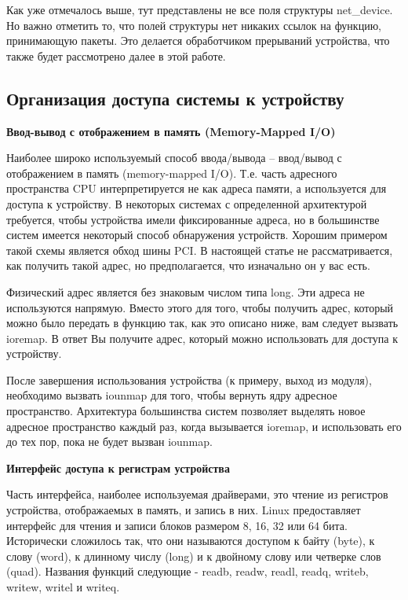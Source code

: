 Как уже отмечалось выше, тут представлены не все поля структуры net\_device. Но важно отметить то, что полей структуры нет никаких ссылок на функцию, принимающую пакеты. Это делается обработчиком прерываний устройства, что также будет рассмотрено далее в этой работе\cite{Rosen}.

\newpage
\subsection{Организация доступа системы к устройству}

\textbf{Ввод-вывод с отображением в память (Memory-Mapped I/O)}

Наиболее широко используемый способ ввода/вывода -- ввод/вывод с отображением в память (memory-mapped I/O)\cite{Cragon}. Т.е. часть адресного пространства CPU интерпретируется не как адреса памяти, а используется для доступа к устройству. В некоторых системах с определенной архитектурой требуется, чтобы устройства имели фиксированные адреса, но в большинстве систем имеется некоторый способ обнаружения устройств. Хорошим примером такой схемы является обход шины PCI. В настоящей статье не рассматривается, как получить такой адрес, но предполагается, что изначально он у вас есть.

Физический адрес является без знаковым числом типа long. Эти адреса не используются напрямую. Вместо этого для того, чтобы получить адрес, который можно было передать в функцию так, как это описано ниже, вам следует вызвать ioremap. В ответ Вы получите адрес, который можно использовать для доступа к устройству.

После завершения использования устройства (к примеру, выход из модуля), необходимо вызвать iounmap для того, чтобы вернуть ядру адресное пространство. Архитектура большинства систем позволяет выделять новое адресное пространство каждый раз, когда вызывается ioremap, и использовать его до тех пор, пока не будет вызван iounmap.

\textbf{Интерфейс доступа к регистрам устройства}

Часть интерфейса, наиболее используемая драйверами, это чтение из регистров устройства, отображаемых в память, и запись в них\cite{Cragon}. Linux предоставляет интерфейс для чтения и записи блоков размером 8, 16, 32 или 64 бита. Исторически сложилось так, что они называются доступом к байту (byte), к слову (word), к длинному числу (long) и к двойному слову или четверке слов (quad). Названия функций следующие - readb, readw, readl, readq, writeb, writew, writel и writeq.

